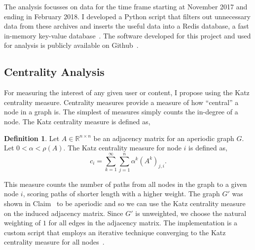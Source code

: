 \documentclass[letterpaper, 10 pt, conference]{ieeeconf}
\theoremstyle{definition}
\newtheorem{definition}{Definition}[section]
\newcommand{\R}{\mathbb{R}}
\begin{document}
The analysis focusses on data for the time frame starting at November 2017 and ending in February 2018. I developed a Python script that filters out unnecessary data from these archives and inserts the useful data into a Redis database, a fast in-memory key-value database~\cite{Software:Redis}. The software developed for this project and used for analysis is publicly available on Github~\cite{Software:Mine}.

\subsection{Centrality Analysis}
For measuring the interest of any given user or content, I propose using the Katz centrality measure. Centrality measures provide a measure of how ``central'' a node in a graph is. The simplest of measures simply counts the in-degree of a node. The Katz centrality measure is defined as,
\begin{definition}
  Let \(A\in \R^{n\times n}\) be an adjacency matrix for an aperiodic graph \(G.\) Let \(0 < \alpha < \rho(A)\). The Katz centrality measure for node \(i\) is defined as,
  \[
    c_i = \sum_{k=1}^\infty{ \sum_{j=1}^n {\alpha^k \left( A^k \right)_{j,i}} }.
  \]
\end{definition}
This measure counts the number of paths from all nodes in the graph to a given node \(i\), scoring paths of shorter length with a higher weight. The graph \(G'\) was shown in Claim~\cite{claim:g1:aperiodic} to be aperiodic and so we can use the Katz centrality measure on the induced adjacency matrix. Since \(G'\) is unweighted, we choose the natural weighting of \(1\) for all edges in the adjacency matrix. The implementation is a custom script that employs an iterative technique converging to the Katz centrality measure for all nodes~\cite{Notes:Network}.
\end{document}
